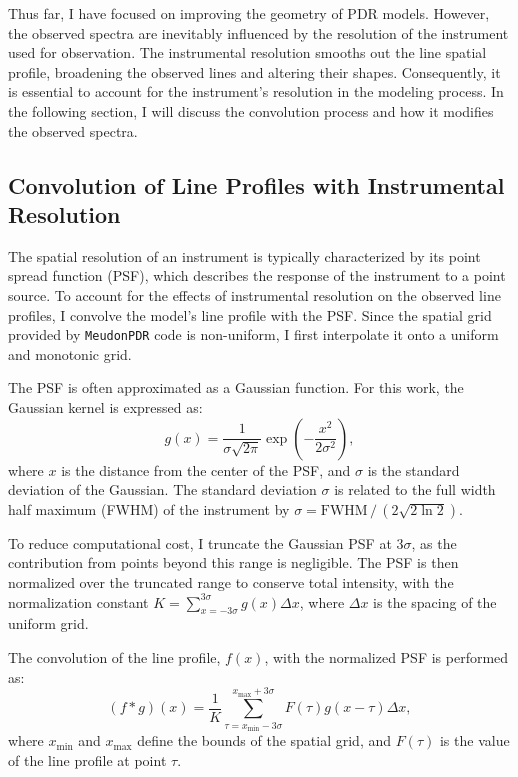\documentclass[12pt,a4paper]{article}
\newcommand{\mdpdr}{\texttt{MeudonPDR} code}
\begin{document}
Thus far, I have focused on improving the geometry of PDR models. However, the observed spectra are inevitably influenced by the resolution of the instrument used for observation. The instrumental resolution smooths out the line spatial profile, broadening the observed lines and altering their shapes. Consequently, it is essential to account for the instrument's resolution in the modeling process. In the following section, I will discuss the convolution process and how it modifies the observed spectra.

\subsection{Convolution of Line Profiles with Instrumental Resolution} \label{sec:convolution}

The spatial resolution of an instrument is typically characterized by its point spread function (PSF), which describes the response of the instrument to a point source. To account for the effects of instrumental resolution on the observed line profiles, I convolve the model's line profile with the PSF. Since the spatial grid provided by \mdpdr{} is non-uniform, I first interpolate it onto a uniform and monotonic grid.

The PSF is often approximated as a Gaussian function. For this work, the Gaussian kernel is expressed as:
\begin{equation}
    g(x) = \frac{1}{\sigma\sqrt{2\pi}}\exp(-\frac{x^2}{2\sigma^2}),
\end{equation}
where $x$ is the distance from the center of the PSF, and $\sigma$ is the standard deviation of the Gaussian. The standard deviation $\sigma$ is related to the full width half maximum (FWHM) of the instrument by $\sigma = \text{FWHM}\,/\,(2\sqrt{2 \ln 2})$.

To reduce computational cost, I truncate the Gaussian PSF at $3\sigma$, as the contribution from points beyond this range is negligible. The PSF is then normalized over the truncated range to conserve total intensity, with the normalization constant $K = \sum_{x=-3\sigma}^{3\sigma} g(x) \Delta x$, where $\Delta x$ is the spacing of the uniform grid.

The convolution of the line profile, $f(x)$, with the normalized PSF is performed as:
\begin{equation}
    (f * g) (x) = \frac{1}{K} \sum_{\tau = x_{\min} - 3\sigma}^{x_{\max} + 3\sigma}F(\tau)g(x - \tau)\Delta x,
\end{equation}
where $x_{\min}$ and $x_{\max}$ define the bounds of the spatial grid, and $F(\tau)$ is the value of the line profile at point $\tau$. 
\end{document}
